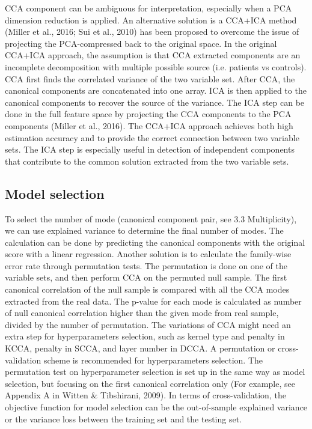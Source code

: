 CCA component can be ambiguous for interpretation, especially when a PCA dimension reduction is applied. An alternative solution is a  CCA+ICA method (Miller et al., 2016; Sui et al., 2010) has been proposed to overcome the issue of projecting the PCA-compressed back to the original space. In the original CCA+ICA approach, the assumption is that CCA extracted components are an incomplete decomposition with multiple possible source (i.e. patients vs controls). CCA first finds the correlated variance of the two variable set. After CCA, the canonical components are concatenated into one array. ICA is then applied to the canonical components to recover the source of the variance. The ICA step can be done in the full feature space by projecting the CCA components to the PCA components (Miller et al., 2016). The CCA+ICA approach achieves both high estimation accuracy and to provide the correct connection between two variable sets. The ICA step is especially useful in detection of independent components that contribute to the common solution extracted from the two variable sets. 

\subsection{Model selection}
To select the number of mode (canonical component pair, see 3.3 Multiplicity), we can use explained variance to determine the final number of modes. The calculation can be done by predicting the canonical components with the original score with a linear regression. Another solution is to calculate the family-wise error rate through permutation tests.  The permutation is done on one of the variable sets, and then perform CCA on the permuted null sample. The first canonical correlation of the null sample is compared with all the CCA modes extracted from the real data. The p-value for each mode is calculated as number of null canonical correlation higher than the given mode from real sample, divided by  the number of permutation.
The variations of CCA might need an extra step for hyperparameters selection, such as kernel type and penalty in KCCA, penalty in SCCA, and layer number in DCCA. A permutation or cross-validation scheme is recommended for hyperparameters selection. The permutation test on hyperparameter selection is set up in the same way as model selection, but focusing on the first canonical correlation only (For example, see Appendix A in Witten \& Tibshirani, 2009). In terms of cross-validation, the objective function for model selection can be the out-of-sample explained variance or the variance loss between the training set and the testing set. 

